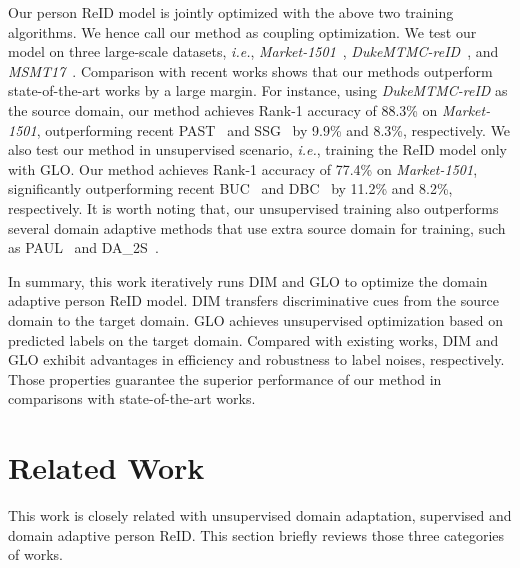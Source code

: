 \documentclass[sigconf]{acmart}
\begin{document}
Our person ReID model is jointly optimized with the above two training algorithms. We hence call our method as coupling optimization. We test our model on three large-scale datasets, \textit{i.e.}, \textit{Market-1501}~\cite{market}, \textit{DukeMTMC-reID}~\cite{duke}, and \textit{MSMT17}~\cite{msmt}. Comparison with recent works shows that our methods outperform state-of-the-art works by a large margin. For instance, using \textit{DukeMTMC-reID} as the source domain, our method achieves Rank-1 accuracy of 88.3\% on \textit{Market-1501}, outperforming recent PAST~\cite{Zhang_2019_ICCV} and SSG~\cite{ssg} by 9.9\% and 8.3\%, respectively. We also test our method in unsupervised scenario, \emph{i.e.}, training the ReID model only with GLO. Our method achieves Rank-1 accuracy of 77.4\% on \textit{Market-1501}, significantly outperforming recent BUC~\cite{lin2019bottom} and DBC~\cite{ding2019towards} by 11.2\% and 8.2\%, respectively. It is worth noting that, our unsupervised training also outperforms several domain adaptive methods that use extra source domain for training, such as PAUL~\cite{yang2019patch} and DA\_2S~\cite{huang2019sbsgan}.

In summary, this work iteratively runs DIM and GLO to optimize the domain adaptive person ReID model. DIM transfers discriminative cues from the source domain to the target domain. GLO achieves unsupervised optimization based on predicted labels on the target domain. Compared with existing works, DIM and GLO exhibit advantages in efficiency and robustness to label noises, respectively. Those properties guarantee the superior performance of our method in comparisons with state-of-the-art works.

\section{Related Work}
\label{sec:related_work}
This work is closely related with unsupervised domain adaptation, supervised and domain adaptive person ReID. This section briefly reviews those three categories of works.
\end{document}
